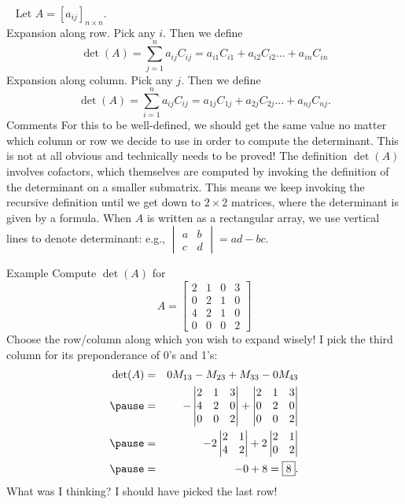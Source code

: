\begin{frame}
 \ {\tiny
Let $A=[a_{ij}]_{n\times n}$.
\\
\alert{Expansion along row.} Pick any $i$. Then we define 
\[
\det(A)=\sum_{j=1}^na_{ij}C_{ij}=a_{i1}C_{i1}+a_{i2}C_{i2}\dots +a_{in}C_{in}
\] 
\alert{Expansion along column.} Pick any $j$. Then we define 
\[
\det(A)=\sum_{i=1}^na_{ij}C_{ij}=a_{1j}C_{1j}+a_{2j}C_{2j}\dots +a_{nj}C_{nj}.
\] 
}
\footnotesize
\alert{Comments}
\bb
\pause\ii For this to be well-defined, we should get the same value no matter which column or row we decide to use in order to compute the determinant. \alert{This is not at all obvious and technically needs to be proved!}
\pause\ii The definition $\det(A)$ involves cofactors, which themselves are computed by invoking the definition of the determinant on a smaller submatrix. This means we keep invoking the recursive definition until we get down to  $2\times 2$ matrices, where the determinant is given by a formula.  
\pause\ii When $A$ is written as a rectangular array, we use vertical lines to denote determinant: e.g., $\begin{vmatrix}
a&b\\c&d
\end{vmatrix}
=ad-bc$.
\ee
\end{frame}
\begin{frame}{Example}
Compute $\det(A)$ for 
\[
A=\begin{bmatrix}
2&1&0&3\\
0&2&1&0\\
4&2&1&0\\
0&0&0&2
\end{bmatrix}
\]
\pause
Choose the row/column along which you wish to expand wisely! I pick the third column for its preponderance of 0's and 1's:
\begin{eqnarray*}
\det(A)&=&0M_{13}-M_{23}+M_{33}-0M_{43}\\
\pause&=&-\begin{vmatrix}
2&1&3\\4&2&0\\0&0&2
\end{vmatrix}
+
\begin{vmatrix}
2&1&3\\ 0&2&0\\0&0&2
\end{vmatrix}\\
\pause&=&-2\begin{vmatrix}
2&1\\4&2
\end{vmatrix}
+
2\begin{vmatrix}
2&1\\0&2
\end{vmatrix}
\\
\pause &=&-0+8=\boxed{8}.
\end{eqnarray*}
\pause What was I thinking? I should have picked the last row!
\end{frame}
